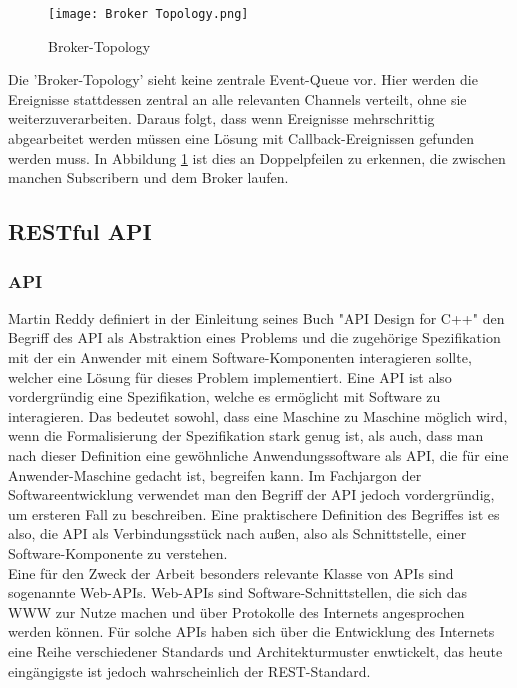 \begin{figure}[H]
  \centering
  \texttt{[image: Broker Topology.png]}
  \caption[Broker-Topology]{Broker-Topology \footnotemark}
  \label{brokertop}
\end{figure}
Die 'Broker-Topology' sieht keine zentrale Event-Queue vor. Hier werden die Ereignisse stattdessen zentral an alle relevanten Channels verteilt, ohne sie weiterzuverarbeiten. Daraus folgt, dass wenn Ereignisse mehrschrittig abgearbeitet werden müssen eine Lösung mit Callback-Ereignissen gefunden werden muss. In Abbildung \ref{brokertop} ist dies an Doppelpfeilen zu erkennen, die zwischen manchen Subscribern und dem Broker laufen. \cite[Vgl. ][]{wickramarachchi_2017_event}

\subsection{RESTful API}
\subsubsection*{API}
Martin Reddy definiert in der Einleitung seines Buch "API Design for C++" den Begriff des \ac{API} als Abstraktion eines Problems und die zugehörige Spezifikation mit der ein Anwender mit einem Software-Komponenten interagieren sollte, welcher eine Lösung für dieses Problem implementiert. \cite[Vgl. ][S. 1]{reddy2011api} Eine API ist also vordergründig eine Spezifikation, welche es ermöglicht mit Software zu interagieren. Das bedeutet sowohl, dass eine Maschine zu Maschine möglich wird, wenn die Formalisierung der Spezifikation stark genug ist, als auch, dass man nach dieser Definition eine gewöhnliche Anwendungssoftware als API, die für eine Anwender-Maschine gedacht ist, begreifen kann. Im Fachjargon der Softwareentwicklung verwendet man den Begriff der \ac{API} jedoch vordergründig, um ersteren Fall zu beschreiben. Eine praktischere Definition des Begriffes ist es also, die API als Verbindungsstück nach außen, also als Schnittstelle, einer Software-Komponente zu verstehen. \\
Eine für den Zweck der Arbeit besonders relevante Klasse von \ac{API}s sind sogenannte Web-\ac{API}s. Web-\ac{API}s sind Software-Schnittstellen, die sich das \ac{WWW} zur Nutze machen und über Protokolle des Internets angesprochen werden können. Für solche \ac{API}s haben sich über die Entwicklung des Internets eine Reihe verschiedener Standards und Architekturmuster enwtickelt, das heute eingängigste ist jedoch wahrscheinlich der REST-Standard. \cite[Vgl. ][S.5f]{richardson2007web}
